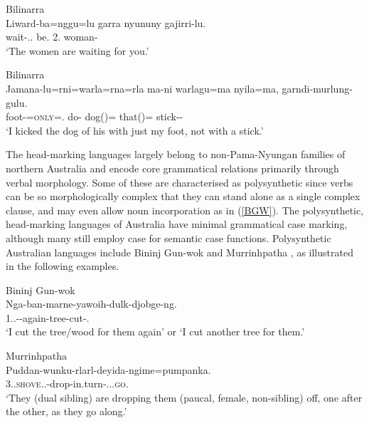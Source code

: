 \documentclass[output=paper,hidelinks]{langscibook}
\begin{document}
%
\ea Bilinarra\\
\gll Liward-ba=nggu=lu garra nyununy gajirri-lu.\\
{wait-\MIN.\AUG.\SBJ} 	{be.\PRS} {2\MIN.\DAT} {woman-\ERG}\\
\glt `The women are waiting for you.’ \citep[121]{MeakNord14}
\z

\ea Bilinarra\\
\gll Jamana-lu=rni=warla=rna=rla ma-ni warlagu=ma nyila=ma, garndi-murlung-gulu.\\ 	
 {foot-\ERG={\textsc{only}}=\MIN.\OBL}	 {do-\PST}	 {dog(\ACC)=\TOP} {that(\ACC)=\TOP} {stick-\PRIV-\ERG}\\
\glt `I kicked the dog of his with just my foot, not with a stick.' \citep[121]{MeakNord14}
\z

The head-marking languages largely belong to non-Pama-Nyungan families of northern Australia and encode core grammatical relations primarily through verbal morphology. Some of these are characterised as polysynthetic since verbs can be so morphologically complex that they can stand alone as a single complex clause, and may even allow noun incorporation as in (\ref{BGW}). The polysynthetic, head-marking languages of Australia have minimal grammatical case marking, although many still employ case for semantic case functions. Polysynthetic Australian languages include Bininj Gun-wok \citep{Evans2003} and Murrinhpatha \citep{Blythe2009,Nordlinger2017,Mansfield2019}, as illustrated in the following examples. 

\ea \label{BGW} Bininj Gun-wok\\
\gll Nga-ban-marne-yawoih-dulk-djobge-ng.\\
	{1\SG.\PL.\OBJ-\BEN-again-tree-cut-\PST.\PFV}\\
\glt	`I cut the tree/wood for them again' or ‘I cut another tree for them.’ \citep[2]{EvanSass2002}
\z

\ea Murrinhpatha\\
\gll Puddan-wunku-rlarl-deyida-ngime=pumpanka.\\ 
 {3\DU.\SBJ.\textsc{shove}.\DU.\OBJ-drop-in.turn-\PC.\DU.\SBJ.\textsc{go}.\NFUT}\\ 
\glt	`They (dual sibling) are dropping them (paucal, female, non-sibling) off, one after the other, as they go along.’ \citep[134]{Blythe2009}
\z
\end{document}
